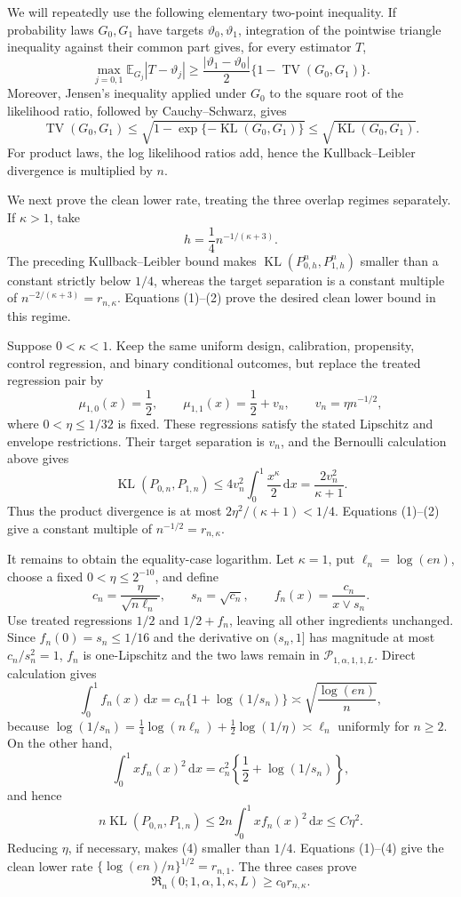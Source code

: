 We will repeatedly use the following elementary two-point inequality. If probability laws \(G_0,G_1\) have targets \(\vartheta_0,\vartheta_1\), integration of the pointwise triangle inequality against their common part gives, for every estimator \(T\),
\[
\max_{j=0,1}\mathbb E_{G_j}|T-\vartheta_j|
\geq\frac{|\vartheta_1-\vartheta_0|}{2}
\{1-\operatorname{TV}(G_0,G_1)\}.
\tag{1}
\]
Moreover, Jensen's inequality applied under \(G_0\) to the square root of the likelihood ratio, followed by Cauchy--Schwarz, gives
\[
\operatorname{TV}(G_0,G_1)
\leq\sqrt{1-\exp\{-\operatorname{KL}(G_0,G_1)\}}
\leq\sqrt{\operatorname{KL}(G_0,G_1)}.
\tag{2}
\]
For product laws, the log likelihood ratios add, hence the Kullback--Leibler divergence is multiplied by \(n\).

We next prove the clean lower rate, treating the three overlap regimes separately. If \(\kappa>1\), take
\[
h=\frac14n^{-1/(\kappa+3)}.
\]
The preceding Kullback--Leibler bound makes \(\operatorname{KL}(P_{0,h}^n,P_{1,h}^n)\) smaller than a constant strictly below \(1/4\), whereas the target separation is a constant multiple of \(n^{-2/(\kappa+3)}=r_{n,\kappa}\). Equations (1)--(2) prove the desired clean lower bound in this regime.

Suppose \(0<\kappa<1\). Keep the same uniform design, calibration, propensity, control regression, and binary conditional outcomes, but replace the treated regression pair by
\[
\mu_{1,0}(x)=\frac12,
\qquad
\mu_{1,1}(x)=\frac12+v_n,
\qquad
v_n=\eta n^{-1/2},
\]
where \(0<\eta\leq1/32\) is fixed. These regressions satisfy the stated Lipschitz and envelope restrictions. Their target separation is \(v_n\), and the Bernoulli calculation above gives
\[
\operatorname{KL}(P_{0,n},P_{1,n})
\leq4v_n^2\int_0^1\frac{x^\kappa}{2}\,\mathrm dx
=\frac{2v_n^2}{\kappa+1}.
\]
Thus the product divergence is at most \(2\eta^2/(\kappa+1)<1/4\). Equations (1)--(2) give a constant multiple of \(n^{-1/2}=r_{n,\kappa}\).

It remains to obtain the equality-case logarithm. Let \(\kappa=1\), put \(\ell_n=\log(en)\), choose a fixed \(0<\eta\leq2^{-10}\), and define
\[
c_n=\frac{\eta}{\sqrt{n\ell_n}},
\qquad s_n=\sqrt{c_n},
\qquad
f_n(x)=\frac{c_n}{x\vee s_n}.
\]
Use treated regressions \(1/2\) and \(1/2+f_n\), leaving all other ingredients unchanged. Since \(f_n(0)=s_n\leq1/16\) and the derivative on \((s_n,1]\) has magnitude at most \(c_n/s_n^2=1\), \(f_n\) is one-Lipschitz and the two laws remain in \(\mathcal P_{1,\alpha,1,1,L}\). Direct calculation gives
\[
\int_0^1f_n(x)\,\mathrm dx
=c_n\{1+\log(1/s_n)\}
\asymp \sqrt{\frac{\log(en)}{n}},
\tag{3}
\]
because \(\log(1/s_n)=\tfrac14\log(n\ell_n)+\tfrac12\log(1/\eta)\asymp\ell_n\) uniformly for \(n\geq2\). On the other hand,
\[
\int_0^1x f_n(x)^2\,\mathrm dx
=c_n^2\left\{\frac12+\log(1/s_n)\right\},
\]
and hence
\[
n\operatorname{KL}(P_{0,n},P_{1,n})
\leq2n\int_0^1x f_n(x)^2\,\mathrm dx
\leq C\eta^2.
\tag{4}
\]
Reducing \(\eta\), if necessary, makes (4) smaller than \(1/4\). Equations (1)--(4) give the clean lower rate \(\{\log(en)/n\}^{1/2}=r_{n,1}\). The three cases prove
\[
\mathfrak R_n(0;1,\alpha,1,\kappa,L)\geq c_0r_{n,\kappa}.
\tag{5}
\]

